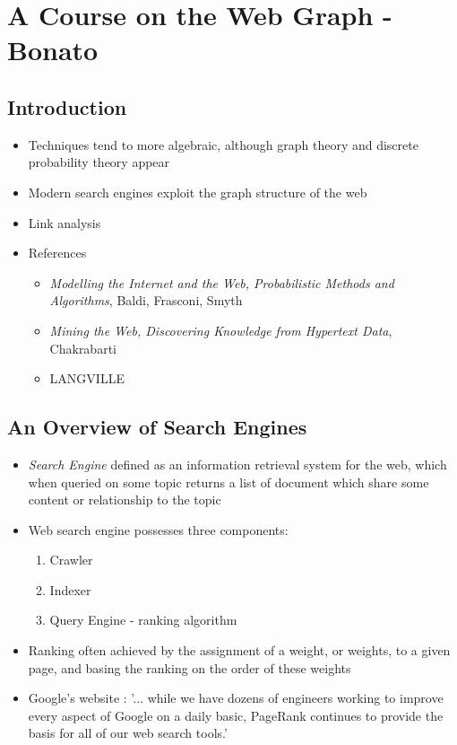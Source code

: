 \documentclass[11pt]{report}
\begin{document}
\chapter{A Course on the Web Graph - Bonato}
\section{Introduction}
\begin{itemize}
\item Techniques tend to more algebraic, although graph theory and discrete probability theory appear
\item Modern search engines exploit the graph structure of the web
\item Link analysis
\item References
\begin{itemize}
\item \textit{Modelling the Internet and the Web, Probabilistic Methods and Algorithms}, Baldi, Frasconi, Smyth
\item \textit{Mining the Web, Discovering Knowledge from Hypertext Data}, Chakrabarti
\item LANGVILLE
\end{itemize}
\end{itemize}
\section{An Overview of Search Engines}
\begin{itemize}
\item\textit{Search Engine} defined as an information retrieval system for the web, which when queried on some topic returns a list of document which share some content or relationship to the topic
\item Web search engine possesses three components:
\begin{enumerate}
\item Crawler
\item Indexer
\item Query Engine - ranking algorithm
\end{enumerate}
\item Ranking often achieved by the assignment of a weight, or weights, to a given page, and basing the ranking on the order of these weights
\item Google's website : '... while we have dozens of engineers working to improve every aspect of Google on a daily basic, PageRank continues to provide the basis for all of our web search tools.'
\end{itemize}
\end{document}
